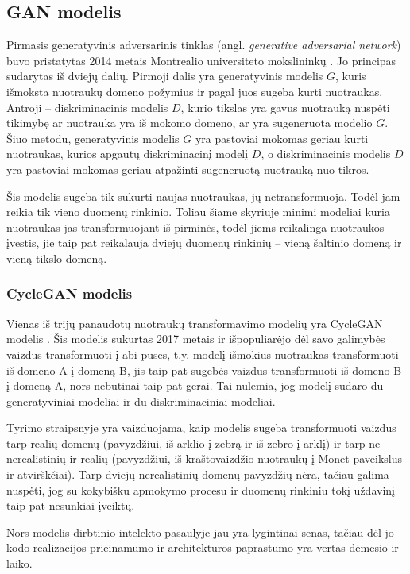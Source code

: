 \documentclass{VUMIFPSbakalaurinis}
\begin{document}
    \subsection{GAN modelis}
        Pirmasis generatyvinis adversarinis tinklas (angl. \emph{generative adversarial network}) buvo pristatytas 2014 metais Montrealio universiteto mokslininkų \cite{OrigGan}. Jo principas sudarytas iš dviejų dalių. Pirmoji dalis yra generatyvinis modelis $G$, kuris išmoksta nuotraukų domeno požymius ir pagal juos sugeba kurti nuotraukas. Antroji – diskriminacinis modelis $D$, kurio tikslas yra gavus nuotrauką nuspėti tikimybę ar nuotrauka yra iš mokomo domeno, ar yra sugeneruota modelio $G$. Šiuo metodu, generatyvinis modelis $G$ yra pastoviai mokomas geriau kurti nuotraukas, kurios apgautų diskriminacinį modelį $D$, o diskriminacinis modelis $D$ yra pastoviai mokomas geriau atpažinti sugeneruotą nuotrauką nuo tikros.

        Šis modelis sugeba tik sukurti naujas nuotraukas, jų netransformuoja. Todėl jam reikia tik vieno duomenų rinkinio. Toliau šiame skyriuje minimi modeliai kuria nuotraukas jas transformuojant iš pirminės, todėl jiems reikalinga nuotraukos įvestis, jie taip pat reikalauja dviejų duomenų rinkinių – vieną šaltinio domeną ir vieną tikslo domeną.
        \subsubsection{CycleGAN modelis}
            Vienas iš trijų panaudotų nuotraukų transformavimo modelių yra CycleGAN modelis \cite{CycleGAN2017}. Šis modelis sukurtas 2017 metais ir išpopuliarėjo dėl savo galimybės vaizdus transformuoti į abi puses, t.y. modelį išmokius nuotraukas transformuoti iš domeno A į domeną B, jis taip pat sugebės vaizdus transformuoti iš domeno B į domeną A, nors nebūtinai taip pat gerai. Tai nulemia, jog modelį sudaro du generatyviniai modeliai ir du diskriminaciniai modeliai.
    
            Tyrimo straipsnyje yra vaizduojama, kaip modelis sugeba transformuoti vaizdus tarp realių domenų (pavyzdžiui, iš arklio į zebrą ir iš zebro į arklį) ir tarp ne nerealistinių ir realių (pavyzdžiui, iš kraštovaizdžio nuotraukų į Monet paveikslus ir atvirškčiai). Tarp dviejų nerealistinių domenų pavyzdžių nėra, tačiau galima nuspėti, jog su kokybišku apmokymo procesu ir duomenų rinkiniu tokį uždavinį taip pat nesunkiai įveiktų.
    
            Nors modelis dirbtinio intelekto pasaulyje jau yra lygintinai  senas, tačiau dėl jo kodo realizacijos prieinamumo ir architektūros paprastumo yra vertas dėmesio ir laiko.
            
\end{document}
